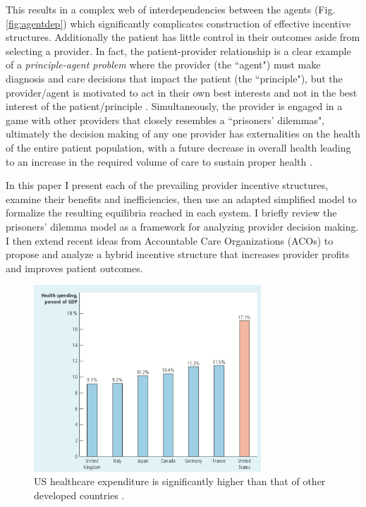 \documentclass{article}
\begin{document}
This results in a complex web of interdependencies between the agents (Fig. \ref{fig:agentdep}) which significantly complicates construction of effective incentive structures. Additionally the patient has little control in their outcomes aside from selecting a provider. In fact, the patient-provider relationship is a clear example of a \emph{principle-agent problem} \cite{principle} where the provider (the ``agent") must make diagnosis and care decisions that impact the patient (the ``principle"), but the provider/agent is motivated to act in their own best interests and not in the best interest of the patient/principle \cite{msdt}. Simultaneously, the provider is engaged in a game with other providers that closely resembles a ``prisoners' dilemmas", ultimately the decision making of any one provider has externalities on the health of the entire patient population, with a future decrease in overall health leading to an increase in the required volume of care to sustain proper health \cite{blended}.

In this paper I present each of the prevailing provider incentive structures, examine their benefits and inefficiencies, then use an adapted simplified model to formalize the resulting equilibria reached in each system. I briefly review the prisoners' dilemma model as a framework for analyzing provider decision making. I then extend recent ideas from Accountable Care Organizations (ACOs) to propose and analyze a hybrid incentive structure that increases provider profits and improves patient outcomes.

\begin{figure}[H]
\includegraphics[height=7cm]{usspend}
\centering
\caption{US healthcare expenditure is significantly higher than that of other developed countries \cite{econharvard}.}
\label{fig:usspend}
\end{figure}
\end{document}

